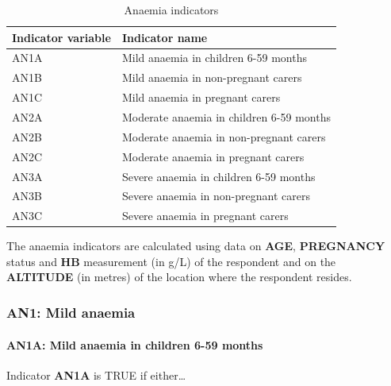 \documentclass[12pt,a4paper]{article}
\let\oldparagraph\paragraph
\renewcommand{\paragraph}[1]{\oldparagraph{#1}\mbox{}}
\begin{document}
\begin{table}[H]

\caption{\label{tab:anaemia1}Anaemia indicators}
\centering
\begin{tabular}[t]{ll}
\toprule
\textbf{Indicator variable} & \textbf{Indicator name}\\
\midrule
\rowcolor{gray!6}  AN1A & Mild anaemia in children 6-59 months\\
AN1B & Mild anaemia in non-pregnant carers\\
\rowcolor{gray!6}  AN1C & Mild anaemia in pregnant carers\\
AN2A & Moderate anaemia in children 6-59 months\\
\rowcolor{gray!6}  AN2B & Moderate anaemia in non-pregnant carers\\
\addlinespace
AN2C & Moderate anaemia in pregnant carers\\
\rowcolor{gray!6}  AN3A & Severe anaemia in children 6-59 months\\
AN3B & Severe anaemia in non-pregnant carers\\
\rowcolor{gray!6}  AN3C & Severe anaemia in pregnant carers\\
\bottomrule
\end{tabular}
\end{table}

The anaemia indicators are calculated using data on \textbf{AGE}, \textbf{PREGNANCY} status and \textbf{HB} measurement (in g/L) of the respondent and on the \textbf{ALTITUDE} (in metres) of the location where the respondent resides.

\newpage

\hypertarget{an1-mild-anaemia}{%
\subsubsection{AN1: Mild anaemia}\label{an1-mild-anaemia}}

\hypertarget{an1a-mild-anaemia-in-children-6-59-months}{%
\paragraph{AN1A: Mild anaemia in children 6-59 months}\label{an1a-mild-anaemia-in-children-6-59-months}}

Indicator \textbf{AN1A} is TRUE if either\ldots{}
\end{document}

